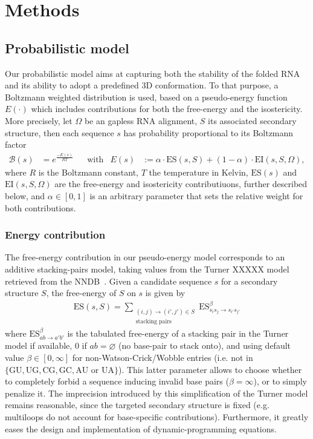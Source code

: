 \section{Methods}
\label{sec:methods}

\newcommand{\PE}[1]{E(#1)}
\newcommand{\EI}{\text{EI}}
\newcommand{\ES}{\text{ES}}
\newcommand{\ISO}{\text{ISO}}

\subsection{Probabilistic model}
Our probabilistic model aims at capturing both the stability of the folded RNA and its ability to adopt a predefined 3D conformation.
To that purpose, a Boltzmann weighted distribution is used, based on a pseudo-energy function $\PE{\cdot}$ which includes contributions for both 
the free-energy and the isostericity. 
More precisely, let $\Omega$ be an gapless RNA alignment, $S$ its associated secondary structure, 
then each sequence $s$ has probability proportional to its Boltzmann factor
\begin{align*}
  \mathcal{B}(s) &= e^\frac{-\PE{s}}{RT} &&\text{with}&\PE{s}&:=\alpha\cdot\ES(s,S)+(1-\alpha)\cdot\EI(s,S,\Omega),
\end{align*}
where $R$ is the Boltzmann constant, $T$ the temperature in Kelvin, $\ES(s)$ and $\EI(s,S,\Omega)$ are the free-energy and isostericity contributiuons, further described below, and $\alpha\in[0,1]$ is an arbitrary parameter that sets the relative weight for both contributions.

\subsubsection{Energy contribution}
The free-energy contribution in our pseudo-energy model corresponds to an additive stacking-pairs model, taking values from the Turner XXXXX model retrieved from the NNDB~\cite{Turner2010}. Given a candidate sequence $s$ for a secondary structure $S$, the free-energy of $S$ on $s$ is given by
\begin{align*}
  \ES(s,S) = \sum_{\substack{(i,j)\to (i',j')\in S\\ \text{stacking pairs}}}\ES^{\beta}_{s_is_j\to s_{i'}s_{j'}} 
\end{align*}
where $\ES^{\beta}_{ab\to a'b'}$ is the tabulated free-energy of a stacking pair in the Turner model if available, $0$ if $ab=\varnothing$ (no base-pair to stack onto), and using default value $\beta\in[0,\infty]$ for non-Watson-Crick/Wobble entries (i.e. not in $\{\text{GU},\text{UG},\text{CG},\text{GC}, \text{AU or UA}\}$). This latter parameter allows to choose whether to completely forbid a sequence inducing invalid base pairs ($\beta = \infty$), or to simply penalize it.
The imprecision introduced by this simplification of the Turner model remains reasonable, since the targeted secondary structure is fixed 
(e.g. multiloops do not account for base-specific contributions). Furthermore, it greatly eases the design and implementation of dynamic-programming equations. 
